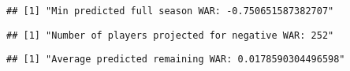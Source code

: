 \documentclass[
]{article}
\newenvironment{Shaded}{\begin{snugshade}}{\end{snugshade}}
\newcommand{\DecValTok}[1]{\textcolor[rgb]{0.00,0.00,0.81}{#1}}
\newcommand{\FunctionTok}[1]{\textcolor[rgb]{0.13,0.29,0.53}{\textbf{#1}}}
\newcommand{\NormalTok}[1]{#1}
\newcommand{\SpecialCharTok}[1]{\textcolor[rgb]{0.81,0.36,0.00}{\textbf{#1}}}
\newcommand{\StringTok}[1]{\textcolor[rgb]{0.31,0.60,0.02}{#1}}
\begin{document}
\begin{verbatim}
## [1] "Min predicted full season WAR: -0.750651587382707"
\end{verbatim}

\begin{Shaded}
\end{Shaded}

\begin{verbatim}
## [1] "Number of players projected for negative WAR: 252"
\end{verbatim}

\begin{Shaded}
\end{Shaded}

\begin{verbatim}
## [1] "Average predicted remaining WAR: 0.0178590304496598"
\end{verbatim}
\end{document}

